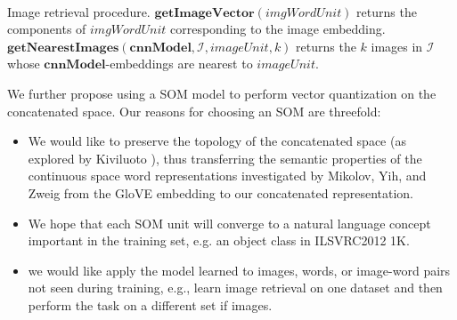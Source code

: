 \documentclass[a4paper]{standalone}
\begin{document}
\begin{algorithm}
    \\
    \caption{Image retrieval procedure. $\mathbf{getImageVector}(imgWordUnit)$ returns the components of $imgWordUnit$ corresponding to the image embedding. $\mathbf{getNearestImages}(\mathbf{cnnModel}, \mathcal{I}, imageUnit, k)$ returns the $k$ images in $\mathcal{I}$ whose $\mathbf{cnnModel}$-embeddings are nearest to $imageUnit$.}\label{alg:RetrieveImage}
\end{algorithm}

We further propose using a SOM model \cite{kohonen1998self} to perform vector quantization on the concatenated space. Our reasons for choosing an SOM are threefold:
\begin{itemize}
    \item We would like to preserve the topology of the concatenated space (as explored by Kiviluoto \cite{kiviluoto1996topology}), thus transferring the semantic properties of the continuous space word representations investigated by Mikolov, Yih, and Zweig \cite{mikolov2013linguistic} from the GloVE embedding to our concatenated representation.
    \item We hope that each SOM unit will converge to a natural language concept important in the training set, e.g. an object class in ILSVRC2012 1K.
    \item we would like apply the model learned to images, words, or image-word pairs not seen during training, e.g., learn image retrieval on one dataset and then perform the task on a different set if images.
\end{itemize}
\end{document}
